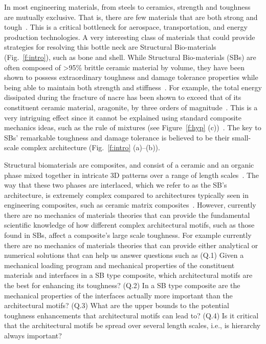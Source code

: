 \documentclass[10pt,letterpaper]{article}
\begin{document}
 In most engineering materials, from steels to ceramics, strength and toughness are mutually exclusive. That is, there are few materials that are both strong and tough~\cite{ritchie2011conflicts}. This is a critical bottleneck for aerospace, transportation, and energy production technologies. A very interesting class of materials that could provide  strategies for resolving this bottle neck are Structural Bio-materials (Fig.~\ref{f:intro}), such as bone and shell.  While Structural Bio-materials (SBs) are often composed of >95\% brittle ceramic material by volume, they have been shown to possess extraordinary toughness and damage tolerance properties while being able to maintain both strength and stiffness~\cite{barthelat2011toughness,rabiei2012nacre,currey2003well,wang2001deformation}. For example, the total energy dissipated during the fracture of nacre has been shown to exceed that of its constituent ceramic material, aragonite, by three orders of magnitude~\cite{currey1976further,Currey:1977wf}.  This is a very intriguing effect since it cannot be explained using standard composite mechanics ideas, such as the rule of mixtures (see Figure~\ref{f:hyp} (c))~\cite{wegst2015bioinspired}. The key to SBs' remarkable toughness and damage tolerance is believed to be their small-scale complex architecture (Fig.~\ref{f:intro} (a)--(b)).%

 Structural biomaterials  are composites, and consist of a ceramic and an organic phase mixed together in intricate 3D patterns over a range of length scales~\cite{mayer2005rigid,meyers2013structural}. The way that these two phases are interlaced, which we refer to as the SB's architecture, is extremely complex compared to architectures typically seen in engineering composites, such as ceramic matrix composites~\cite{padture2002thermal,zhu2004development}.  However, currently there are no  mechanics of materials theories that can provide the fundamental scientific  knowledge  of  how different complex architectural motifs, such as those found in SBs,  affect a  composite's large scale toughness. For example currently  there are no mechanics of materials theories that can provide either analytical or numerical solutions that can help us  answer questions such as (Q.1) Given a mechanical loading program and mechanical  properties of the constituent materials  and interfaces in a SB type composite, which  architectural motifs are the best for enhancing its toughness? (Q.2) In a  SB type composite are the  mechanical properties of  the interfaces actually more important than the architectural motifs?  (Q.3) What are the  upper bounds to the potential toughness enhancements that architectural motifs can lead to?   (Q.4) Is it critical that the architectural motifs  be spread over several length scales, i.e., is hierarchy always important?%
\end{document}
